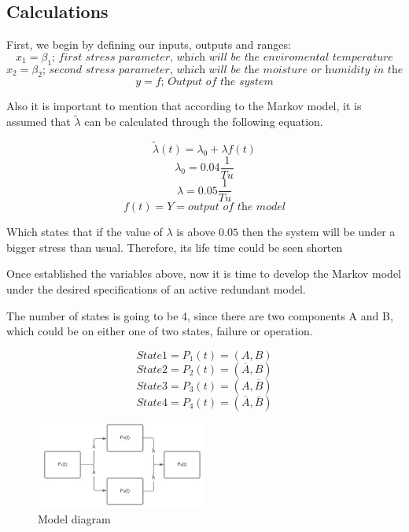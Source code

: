 \documentclass{article}
\begin{document}
\begin{doublespacing}
\subsection{Calculations}

\par First, we begin by defining our inputs, outputs and ranges:
\begin{equation}
x_1 = \beta_1 \textit{; first stress parameter, which will be the enviromental temperature}
\end{equation}
\begin{equation}
x_2 = \beta_2 \textit{; second stress parameter, which will be the moisture or humidity in the enviroment}
\end{equation}
\begin{equation}
y = f \textit{; Output of the system}
\end{equation}

\par Also it is important to mention that according to the Markov model, it is assumed that $\tilde{\lambda}$ can be calculated through the following equation.

\begin{equation}
\tilde{\lambda}(t) = \lambda_0 + \lambda f(t)
\label{eq:Lambda}
\end{equation}
$$\lambda_0 = 0.04 \frac{1}{Tu}$$
$$\lambda = 0.05\frac{1}{Tu}$$
$$ f(t) =Y= \textit{output of the model} $$

\par Which states that if the value of $\lambda$ is above $0.05$ then the system will be under a bigger stress than usual. Therefore, its life time could be seen shorten

\par Once established the variables above, now it is time to develop the Markov model under the desired specifications of an active redundant model.

\par The number of states is going to be 4, since there are two components A and B, which could be on either one of two states, failure or operation.

$$\textit{State1} = P_1 (t)= (A,B)$$
$$\textit{State2} = P_2 (t)= (\overline{A} ,B)$$
$$\textit{State3} = P_3 (t)= (A,\overline{B})$$
$$\textit{State4} = P_4 (t)= (\overline{A},\overline{B})$$

\begin{figure}[H] 
    \centering
    \includegraphics[width=0.5\textwidth]{Images/MarkovDiagram.JPG} 
    \caption{Model diagram} 
    \label{fig:ModelDiagram} 
\end{figure}


\end{doublespacing}
\end{document}
